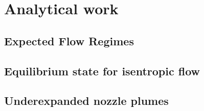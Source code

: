 \section{Analytical work}

\subsection{Expected Flow Regimes}

\newpage

\subsection{Equilibrium state for isentropic flow}

\newpage

\subsection{Underexpanded nozzle plumes}

\newpage
